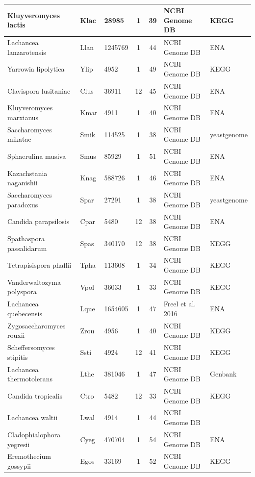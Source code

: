 \documentclass[12pt]{article}
\begin{document}
\begin{table}
\begin{tabular}{ | l | l | l | c | c | l | l | }
	Kluyveromyces lactis 		& Klac 		& 28985 		&	1	& 39 	& NCBI Genome DB 	& KEGG \\ \hline
	Lachancea lanzarotensis 	& Llan 		& 1245769 		&	1	& 44 	& NCBI Genome DB 	& ENA \\ \hline
	Yarrowia lipolytica 		& Ylip 		& 4952 			&	1	& 49 	& NCBI Genome DB 	& KEGG \\ \hline
	Clavispora lusitaniae 		& Clus 		& 36911 		&	12	& 45 	& NCBI Genome DB 	& ENA \\ \hline
	Kluyveromyces marxianus 	& Kmar 		& 4911 			&	1	& 40 	& NCBI Genome DB 	& ENA \\ \hline
	Saccharomyces mikatae 		& Smik 		& 114525 		&	1	& 38 	& NCBI Genome DB 	& yeastgenome \\ \hline
	Sphaerulina musiva 		& Smus 		& 85929 		&	1	& 51 	& NCBI Genome DB 	& ENA \\ \hline
	Kazachstania naganishii 	& Knag 		& 588726 		&	1	& 46 	& NCBI Genome DB 	& ENA \\ \hline
	Saccharomyces paradoxus 	& Spar 		& 27291 		&	1	& 38 	& NCBI Genome DB 	& yeastgenome \\ \hline
	Candida parapsilosis 		& Cpar 		& 5480 			&	12	& 38 	& NCBI Genome DB 	& ENA \\ \hline
	Spathaspora passalidarum 	& Spas 		& 340170 		&	12	& 38 	& NCBI Genome DB 	& KEGG \\ \hline
	Tetrapisispora phaffii 		& Tpha 		& 113608 		&	1	& 34 	& NCBI Genome DB 	& KEGG \\ \hline
	Vanderwaltozyma polyspora 	& Vpol 		& 36033 		&	1	& 33 	& NCBI Genome DB 	& KEGG \\ \hline
	Lachancea quebecensis 		& Lque 		& 1654605 		&	1	& 47 	& Freel et al. 2016 	& ENA \\ \hline
	Zygosaccharomyces rouxii 	& Zrou 		& 4956 			&	1	& 40 	& NCBI Genome DB 	& KEGG \\ \hline
	Scheffersomyces stipitis 	& Ssti 		& 4924 			&	12	& 41 	& NCBI Genome DB 	& KEGG \\ \hline
	Lachancea thermotolerans 	& Lthe 		& 381046 		&	1	& 47 	& NCBI Genome DB 	& Genbank \\ \hline
	Candida tropicalis 		& Ctro 		& 5482 			&	12	& 33 	& NCBI Genome DB 	& KEGG \\ \hline
	Lachancea waltii 		& Lwal 		& 4914 			&	1	& 44 	& NCBI Genome DB 	& \  \\ \hline
	Cladophialophora yegresii 	& Cyeg 		& 470704 		&	1	& 54 	& NCBI Genome DB 	& ENA \\ \hline
	Eremothecium gossypii 		& Egos 		& 33169 		&	1	& 52 	& NCBI Genome DB 	& KEGG \\ \hline
\end{tabular}
\caption{}
\label{tab:org_overview}
\end{table}
\end{document}
